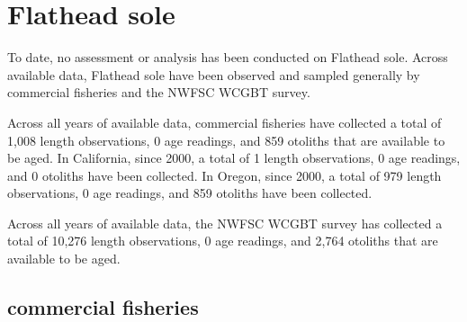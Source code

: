 \documentclass[11pt,
  english,
  letterpaper,
]{article}
\begin{document}

\hypertarget{flathead-sole}{%
\section{Flathead sole}\label{flathead-sole}}

\leavevmode\tagmcend\tagstructend


To date, no assessment or analysis has been conducted on Flathead sole. Across available data, Flathead sole have been observed and sampled generally by commercial fisheries and the NWFSC WCGBT survey.

\leavevmode\tagmcend\tagstructend\par


Across all years of available data, commercial fisheries have collected a total of 1,008 length observations, 0 age readings, and 859 otoliths that are available to be aged. In California, since 2000, a total of 1 length observations, 0 age readings, and 0 otoliths have been collected. In Oregon, since 2000, a total of 979 length observations, 0 age readings, and 859 otoliths have been collected.

\leavevmode\tagmcend\tagstructend\par


Across all years of available data, the NWFSC WCGBT survey has collected a total of 10,276 length observations, 0 age readings, and 2,764 otoliths that are available to be aged.

\leavevmode\tagmcend\tagstructend\par


\hypertarget{commercial-fisheries-21}{%
\subsection{commercial fisheries}\label{commercial-fisheries-21}}

\leavevmode\tagmcend\tagstructend


\begingroup\fontsize{10}{12}\selectfont \begingroup\fontsize{10}{12}\selectfont
\end{document}
